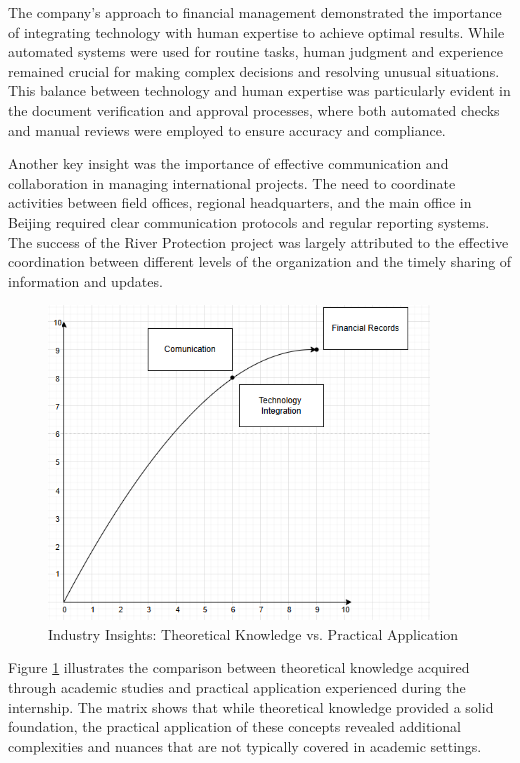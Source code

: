 The company's approach to financial management demonstrated the importance of integrating technology with human expertise to achieve optimal results. While automated systems were used for routine tasks, human judgment and experience remained crucial for making complex decisions and resolving unusual situations. This balance between technology and human expertise was particularly evident in the document verification and approval processes, where both automated checks and manual reviews were employed to ensure accuracy and compliance.

Another key insight was the importance of effective communication and collaboration in managing international projects. The need to coordinate activities between field offices, regional headquarters, and the main office in Beijing required clear communication protocols and regular reporting systems. The success of the River Protection project was largely attributed to the effective coordination between different levels of the organization and the timely sharing of information and updates.

\begin{figure}[H]
    \centering
    \includegraphics[width=0.9\textwidth]{assets/images/industry_insights_matrix.png}
    \caption{Industry Insights: Theoretical Knowledge vs. Practical Application}
    \label{fig:industry_insights_matrix}
\end{figure}

Figure \ref{fig:industry_insights_matrix} illustrates the comparison between theoretical knowledge acquired through academic studies and practical application experienced during the internship. The matrix shows that while theoretical knowledge provided a solid foundation, the practical application of these concepts revealed additional complexities and nuances that are not typically covered in academic settings.

